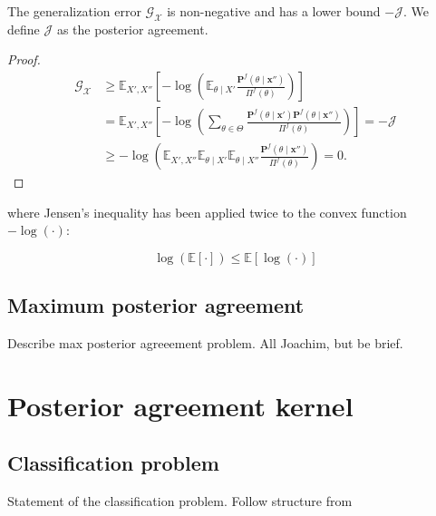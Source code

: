 \begin{lemma}
    The generalization error $\mathcal{G}_{\mathcal{X}}$ is non-negative and has a lower bound $-\mathcal{J}$. We define $\mathcal{J}$ as the posterior agreement.
\end{lemma}
\begin{proof}
    $$
    \begin{aligned}
        \mathcal{G}_{\mathcal{X}} & \geq \mathbb{E}_{X', X''}\left[-\log \left(\mathbb{E}_{\theta \mid X'} \frac{\mathbf{P}^{f}\left(\theta \mid \bm{x}''\right)}{\Pi^{f}(\theta)}\right)\right] \\
        & =\mathbb{E}_{X', X''} \left[-\log \left(\sum_{\theta \in \Theta} \frac{\mathbf{P}^{f}\left(\theta \mid \bm{x}'\right) \mathbf{P}^{f}\left(\theta \mid \bm{x}'' \right)}{\Pi^{f}(\theta)}\right)\right] = -\mathcal{J} \\
        & \geq-\log \left(\mathbb{E}_{X', X''} \mathbb{E}_{\theta \mid X'} \mathbb{E}_{\theta \mid X''} \frac{\mathbf{P}^{f}\left(\theta \mid \bm{x}''\right)}{\Pi^{f}(\theta)}\right)=0 .
    \end{aligned}
    $$
\end{proof}

where Jensen's inequality has been applied twice to the convex function $-\log(\cdot)$:

$$
    \log (\mathbb{E} [\cdot]) \leq \mathbb{E}[\log( \cdot)]
$$

\subsection{Maximum posterior agreement}

Describe max posterior agreeement problem. All Joachim, but be brief.

\section{Posterior agreement kernel}

\subsection{Classification problem}

Statement of the classification problem. Follow structure from 


